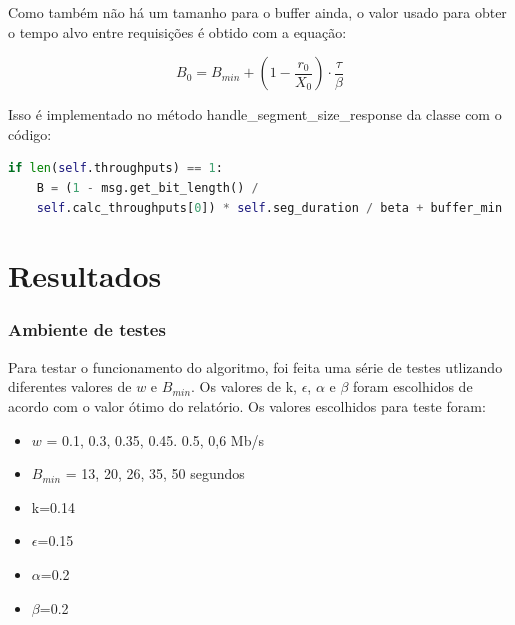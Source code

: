 \documentclass[10pt,twocolumn,letterpaper]{article}
\begin{document}
	Como também não há um tamanho para o buffer ainda, o valor usado para obter o tempo alvo entre requisições é obtido com a equação:
	
	\begin{equation}
		B_0 = B_{min} + (1 - \frac{r_0}{X_0}) \cdot \frac{\tau}{\beta}
	\end{equation}
	
	Isso é implementado no método handle\_segment\_size\_response da classe com o código:
	
	\begin{lstlisting}[language=python]
if len(self.throughputs) == 1:
	B = (1 - msg.get_bit_length() /
	self.calc_throughputs[0]) * self.seg_duration / beta + buffer_min
	\end{lstlisting}
	\section{Resultados}
	\subsubsection{Ambiente de testes}
	Para testar o funcionamento do algoritmo, foi feita uma série de testes utlizando diferentes valores de $w$ e $B_{min}$. Os valores de k, $\epsilon$, $\alpha$ e $\beta$ foram escolhidos de acordo com o valor ótimo do relatório. Os valores escolhidos para teste foram: 
	\begin{itemize}
		\item $w$ = 0.1, 0.3, 0.35, 0.45. 0.5, 0,6 Mb/s
		\item $B_{min}$  = 13, 20, 26, 35, 50 segundos
		\item k=0.14 
		\item $\epsilon$=0.15 
		\item $\alpha$=0.2
		\item $\beta$=0.2
	\end{itemize}
\end{document}
